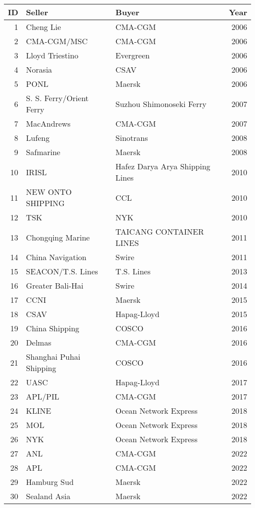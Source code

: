 
\begin{tabular}[t]{rllr}
\toprule
ID & Seller & Buyer & Year\\
\midrule
1 & Cheng Lie & CMA-CGM & 2006\\
2 & CMA-CGM/MSC & CMA-CGM & 2006\\
3 & Lloyd Triestino & Evergreen & 2006\\
4 & Norasia & CSAV & 2006\\
5 & PONL & Maersk & 2006\\
6 & S. S. Ferry/Orient Ferry & Suzhou Shimonoseki Ferry & 2007\\
7 & MacAndrews & CMA-CGM & 2007\\
8 & Lufeng & Sinotrans & 2008\\
9 & Safmarine & Maersk & 2008\\
10 & IRISL & Hafez Darya Arya Shipping Lines & 2010\\
11 & NEW ONTO SHIPPING & CCL & 2010\\
12 & TSK & NYK & 2010\\
13 & Chongqing Marine & TAICANG CONTAINER LINES & 2011\\
14 & China Navigation & Swire & 2011\\
15 & SEACON/T.S. Lines & T.S. Lines & 2013\\
16 & Greater Bali-Hai & Swire & 2014\\
17 & CCNI & Maersk & 2015\\
18 & CSAV & Hapag-Lloyd & 2015\\
19 & China Shipping & COSCO & 2016\\
20 & Delmas & CMA-CGM & 2016\\
21 & Shanghai Puhai Shipping & COSCO & 2016\\
22 & UASC & Hapag-Lloyd & 2017\\
23 & APL/PIL & CMA-CGM & 2017\\
24 & KLINE & Ocean Network Express & 2018\\
25 & MOL & Ocean Network Express & 2018\\
26 & NYK & Ocean Network Express & 2018\\
27 & ANL & CMA-CGM & 2022\\
28 & APL & CMA-CGM & 2022\\
29 & Hamburg Sud & Maersk & 2022\\
30 & Sealand Asia & Maersk & 2022\\
\bottomrule
\end{tabular}
